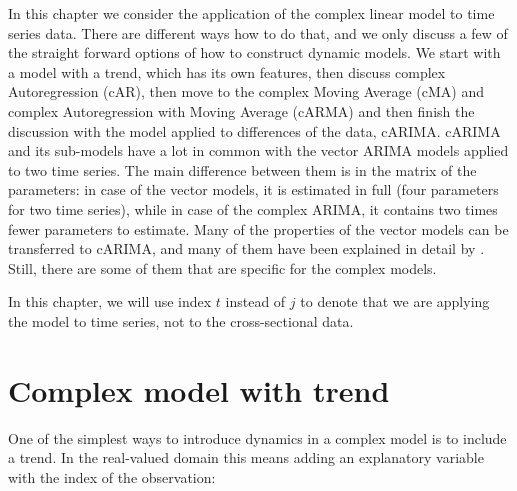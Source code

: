 \documentclass[
]{book}
\begin{document}
In this chapter we consider the application of the complex linear model to time series data. There are different ways how to do that, and we only discuss a few of the straight forward options of how to construct dynamic models. We start with a model with a trend, which has its own features, then discuss complex Autoregression (cAR), then move to the complex Moving Average (cMA) and complex Autoregression with Moving Average (cARMA) and then finish the discussion with the model applied to differences of the data, cARIMA. cARIMA and its sub-models have a lot in common with the vector ARIMA models applied to two time series. The main difference between them is in the matrix of the parameters: in case of the vector models, it is estimated in full (four parameters for two time series), while in case of the complex ARIMA, it contains two times fewer parameters to estimate. Many of the properties of the vector models can be transferred to cARIMA, and many of them have been explained in detail by \citet{Lutkepohl}. Still, there are some of them that are specific for the complex models.

In this chapter, we will use index \(t\) instead of \(j\) to denote that we are applying the model to time series, not to the cross-sectional data.

\hypertarget{DynamicTrend}{%
\section{Complex model with trend}\label{DynamicTrend}}

One of the simplest ways to introduce dynamics in a complex model is to include a trend. In the real-valued domain this means adding an explanatory variable with the index of the observation:
\end{document}
